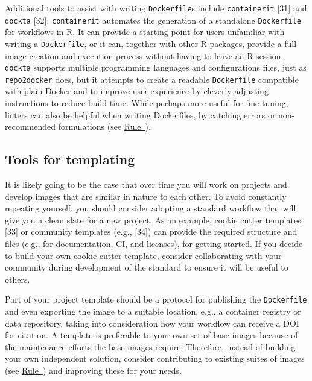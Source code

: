 \documentclass[10pt,letterpaper]{article}
\begin{document}
Additional tools to assist with writing \texttt{Dockerfile}s include
\texttt{containerit} {[}31{]} and \texttt{dockta} {[}32{]}.
\texttt{containerit} automates the generation of a standalone
\texttt{Dockerfile} for workflows in R. It can provide a starting point
for users unfamiliar with writing a \texttt{Dockerfile}, or it can,
together with other R packages, provide a full image creation and
execution process without having to leave an R session. \texttt{dockta}
supports multiple programming languages and configurations files, just
as \texttt{repo2docker} does, but it attempts to create a readable
\texttt{Dockerfile} compatible with plain Docker and to improve user
experience by cleverly adjusting instructions to reduce build time.
While perhaps more useful for fine-tuning, linters can also be helpful
when writing Dockerfiles, by catching errors or non-recommended
formulations (see \hyperref[{rule:usage}]{Rule~}).

\hypertarget{tools-for-templating}{%
\subsection{Tools for templating}\label{tools-for-templating}}

It is likely going to be the case that over time you will work on
projects and develop images that are similar in nature to each other. To
avoid constantly repeating yourself, you should consider adopting a
standard workflow that will give you a clean slate for a new project. As
an example, cookie cutter templates {[}33{]} or community templates
(e.g., {[}34{]}) can provide the required structure and files (e.g., for
documentation, CI, and licenses), for getting started. If you decide to
build your own cookie cutter template, consider collaborating with your
community during development of the standard to ensure it will be useful
to others.

Part of your project template should be a protocol for publishing the
\texttt{Dockerfile} and even exporting the image to a suitable location,
e.g., a container registry or data repository, taking into consideration
how your workflow can receive a DOI for citation. A template is
preferable to your own set of base images because of the maintenance
efforts the base images require. Therefore, instead of building your own
independent solution, consider contributing to existing suites of images
(see \hyperref[{rule:base}]{Rule~}) and improving
these for your needs.
\end{document}
